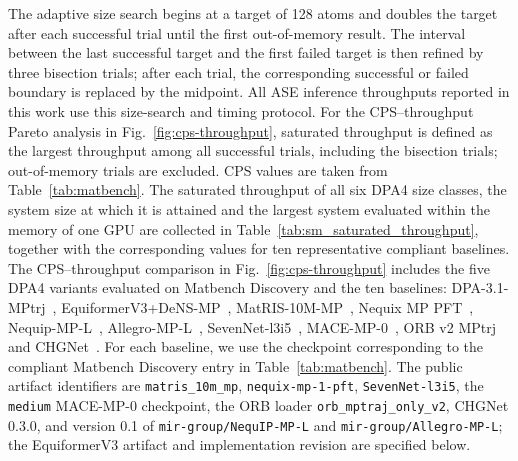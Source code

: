 The adaptive size search begins at a target of 128 atoms and doubles the target after each successful trial until the first out-of-memory result.
The interval between the last successful target and the first failed target is then refined by three bisection trials; after each trial, the corresponding successful or failed boundary is replaced by the midpoint.
All ASE inference throughputs reported in this work use this size-search and timing protocol.
For the CPS--throughput Pareto analysis in Fig.~\ref{fig:cps-throughput}, saturated throughput is defined as the largest throughput among all successful trials, including the bisection trials; out-of-memory trials are excluded.
CPS values are taken from Table~\ref{tab:matbench}.
The saturated throughput of all six DPA4 size classes, the system size at which it is attained and the largest system evaluated within the memory of one GPU are collected in Table~\ref{tab:sm_saturated_throughput}, together with the corresponding values for ten representative compliant baselines.
The CPS--throughput comparison in Fig.~\ref{fig:cps-throughput} includes the five DPA4 variants evaluated on Matbench Discovery and the ten baselines: DPA-3.1-MPtrj~\cite{zhang2025dpa3}, EquiformerV3+DeNS-MP~\cite{liao2026equiformerv3,liao2024dens}, MatRIS-10M-MP~\cite{zhou2026matris}, Nequix MP PFT~\cite{koker2026pft}, Nequip-MP-L~\cite{batzner2022nequip}, Allegro-MP-L~\cite{musaelian2022learning}, SevenNet-l3i5~\cite{park2024scalable}, MACE-MP-0~\cite{batatia2022mace,batatia2023foundation}, ORB v2 MPtrj~\cite{neumann2024orb} and CHGNet~\cite{deng2023chgnet}.
For each baseline, we use the checkpoint corresponding to the compliant Matbench Discovery entry in Table~\ref{tab:matbench}.
The public artifact identifiers are \texttt{matris\_10m\_mp}, \texttt{nequix-mp-1-pft}, \texttt{SevenNet-l3i5}, the \texttt{medium} MACE-MP-0 checkpoint, the ORB loader \texttt{orb\_mptraj\_only\_v2}, CHGNet 0.3.0, and version 0.1 of \texttt{mir-group/NequIP-MP-L} and \texttt{mir-group/Allegro-MP-L}; the EquiformerV3 artifact and implementation revision are specified below.


